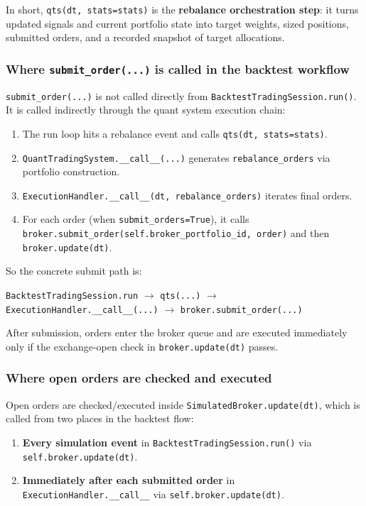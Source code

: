 \documentclass[11pt]{article}
\begin{document}
In short, \texttt{qts(dt, stats=stats)} is the \textbf{rebalance orchestration step}: it turns updated signals and current portfolio state into target weights, sized positions, submitted orders, and a recorded snapshot of target allocations.

\subsubsection{Where \texttt{submit\_order(...)} is called in the backtest workflow}

\texttt{submit\_order(...)} is not called directly from \texttt{BacktestTradingSession.run()}. It is called indirectly through the quant system execution chain:

\begin{enumerate}[leftmargin=*]
  \item The run loop hits a rebalance event and calls \texttt{qts(dt, stats=stats)}.
  \item \texttt{QuantTradingSystem.\_\_call\_\_(...)} generates \texttt{rebalance\_orders} via portfolio construction.
  \item \texttt{ExecutionHandler.\_\_call\_\_(dt, rebalance\_orders)} iterates final orders.
  \item For each order (when \texttt{submit\_orders=True}), it calls \texttt{broker.submit\_order(self.broker\_portfolio\_id, order)} and then \texttt{broker.update(dt)}.
\end{enumerate}

So the concrete submit path is:

\begin{center}
\texttt{BacktestTradingSession.run} $\rightarrow$ \texttt{qts(...)} $\rightarrow$ \texttt{ExecutionHandler.\_\_call\_\_(...)} $\rightarrow$ \texttt{broker.submit\_order(...)}
\end{center}

After submission, orders enter the broker queue and are executed immediately only if the exchange-open check in \texttt{broker.update(dt)} passes.

\subsubsection{Where open orders are checked and executed}

Open orders are checked/executed inside \texttt{SimulatedBroker.update(dt)}, which is called from two places in the backtest flow:

\begin{enumerate}[leftmargin=*]
  \item \textbf{Every simulation event} in \texttt{BacktestTradingSession.run()} via \texttt{self.broker.update(dt)}.
  \item \textbf{Immediately after each submitted order} in \texttt{ExecutionHandler.\_\_call\_\_} via \texttt{self.broker.update(dt)}.
\end{enumerate}
\end{document}
